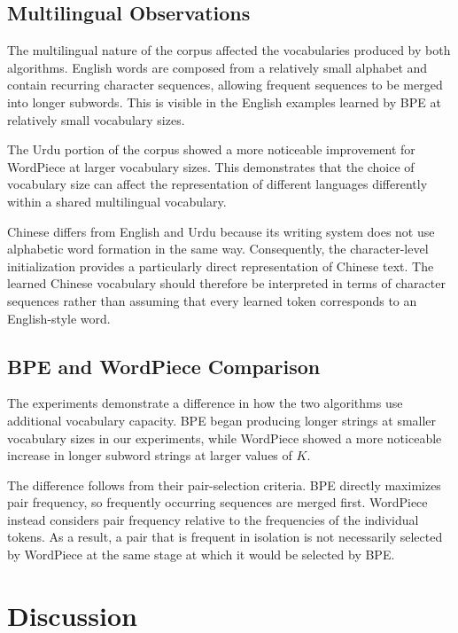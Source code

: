 \documentclass[sigconf]{acmart}
\begin{document}
\subsection{Multilingual Observations}

The multilingual nature of the corpus affected the vocabularies
produced by both algorithms. English words are composed from a
relatively small alphabet and contain recurring character sequences,
allowing frequent sequences to be merged into longer subwords. This is
visible in the English examples learned by BPE at relatively small
vocabulary sizes.

The Urdu portion of the corpus showed a more noticeable improvement
for WordPiece at larger vocabulary sizes. This demonstrates that the
choice of vocabulary size can affect the representation of different
languages differently within a shared multilingual vocabulary.

Chinese differs from English and Urdu because its writing system does
not use alphabetic word formation in the same way. Consequently, the
character-level initialization provides a particularly direct
representation of Chinese text. The learned Chinese vocabulary should
therefore be interpreted in terms of character sequences rather than
assuming that every learned token corresponds to an English-style
word.

\subsection{BPE and WordPiece Comparison}

The experiments demonstrate a difference in how the two algorithms use
additional vocabulary capacity. BPE began producing longer strings at
smaller vocabulary sizes in our experiments, while WordPiece showed a
more noticeable increase in longer subword strings at larger values of
\(K\).

The difference follows from their pair-selection criteria. BPE directly
maximizes pair frequency, so frequently occurring sequences are merged
first. WordPiece instead considers pair frequency relative to the
frequencies of the individual tokens. As a result, a pair that is
frequent in isolation is not necessarily selected by WordPiece at the
same stage at which it would be selected by BPE.

\section{Discussion}
\end{document}
